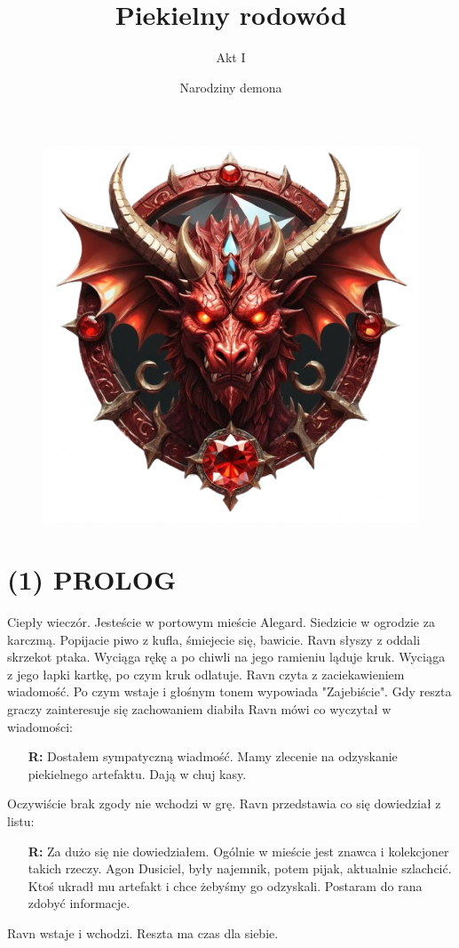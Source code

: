 \documentclass[14pt]{article}
\title{\textbf{Piekielny rodowód}}
\author{Akt I}
\date{Narodziny demona}
\begin{document}
\begin{figure}
    \centering
    \includegraphics[width=1\textwidth]{devil.png}
\end{figure}
\maketitle
\newpage
{}

\centering
\section*{(1) PROLOG}
\RaggedRight
Ciepły wieczór. Jesteście w portowym mieście Alegard. Siedzicie w ogrodzie za karczmą. Popijacie piwo z kufla, śmiejecie się, bawicie. Ravn słyszy z oddali skrzekot ptaka. Wyciąga rękę a po chiwli na jego ramieniu ląduje kruk. Wyciąga z jego łapki kartkę, po czym kruk odlatuje. Ravn czyta z zaciekawieniem wiadomość. Po czym wstaje i głośnym tonem wypowiada "Zajebiście". Gdy reszta graczy zainteresuje się zachowaniem diabiła Ravn mówi co wyczytał w wiadomości:
\begin{itemize}
    \item[\textbf{R:}] Dostałem sympatyczną wiadmość. Mamy zlecenie na odzyskanie piekielnego artefaktu. Dają w chuj kasy.
\end{itemize}
Oczywiście brak zgody nie wchodzi w grę. Ravn przedstawia co się dowiedział z listu:
\begin{itemize}
    \item[\textbf{R:}] Za dużo się nie dowiedziałem. Ogólnie w mieście jest znawca i kolekcjoner takich rzeczy. Agon Dusiciel, były najemnik, potem pijak, aktualnie szlachcić. Ktoś ukradł mu artefakt i chce żebyśmy go odzyskali. Postaram do rana zdobyć informacje.
\end{itemize}
Ravn wstaje i wchodzi. Reszta ma czas dla siebie.
\newpage
\end{document}
